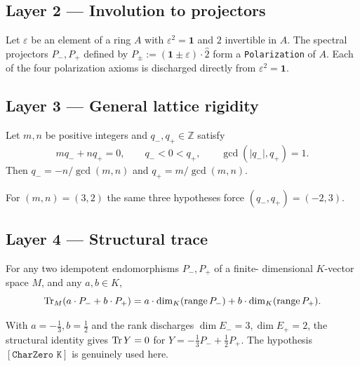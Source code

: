 \documentclass[11pt,a4paper]{article}
\begin{document}
\subsection*{Layer 2 --- Involution to projectors}

\begin{theorem}
Let $\varepsilon$ be an element of a ring $A$ with $\varepsilon^2 = \mathbf 1$ and
$2$ invertible in $A$. The spectral projectors $P_-, P_+$ defined
by $P_\pm := (\mathbf 1\pm\varepsilon)\cdot\widehat 2$ form a
\texttt{Polarization} of $A$. Each of the four polarization
axioms is discharged directly from $\varepsilon^2 = \mathbf 1$.
\end{theorem}

\subsection*{Layer 3 --- General lattice rigidity}

\begin{theorem}
Let $m, n$ be positive integers and $q_-, q_+ \in \mathbb Z$ satisfy
\[
m q_- + n q_+ = 0,\qquad q_- < 0 < q_+,\qquad
\gcd(|q_-|, q_+) = 1.
\]
Then
$q_- = -n/\gcd(m,n)$ and $q_+ = m/\gcd(m,n)$.
\end{theorem}

\begin{corollary}
For $(m, n) = (3, 2)$ the same three hypotheses force
$(q_-, q_+) = (-2, 3)$.
\end{corollary}

\subsection*{Layer 4 --- Structural trace}

\begin{theorem}
For any two idempotent endomorphisms $P_-, P_+$ of a finite-
dimensional $K$-vector space $M$, and any $a, b \in K$,
\[
\operatorname{Tr}_M(a\cdot P_- + b\cdot P_+)
= a \cdot \dim_K(\operatorname{range} P_-)
+ b \cdot \dim_K(\operatorname{range} P_+).
\]
\end{theorem}

\begin{corollary}
With $a=-\tfrac13, b=\tfrac12$ and the rank discharges
$\dim E_- = 3, \dim E_+ = 2$, the structural identity gives
$\operatorname{Tr} Y = 0$ for $Y = -\tfrac13 P_- + \tfrac12 P_+$.
The hypothesis $[\texttt{CharZero K}]$ is genuinely used here.
\end{corollary}
\end{document}

